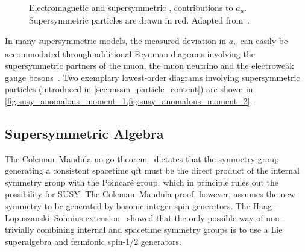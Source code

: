 \begin{figure}
\begin{subfigure}[b]{0.33\linewidth}
		\caption{\label{fig:susy_anomalous_moment_2}}
	\end{subfigure}	
	\caption{Electromagnetic  and supersymmetric ,  contributions to $a_\mu$. Supersymmetric particles are drawn in red. Adapted from~\cite{baer_tata_2006}.}\label{fig:loop_corrections_anomalous_moment}
\end{figure}

In many supersymmetric models, the measured deviation in $a_\mu$ can easily be accommodated through additional Feynman diagrams involving the supersymmetric partners of the muon, the muon neutrino and the electroweak gauge bosons~\cite{Czarnecki:2001pv,Feng:2001tr}. Two exemplary lowest-order diagrams involving supersymmetric particles (introduced in \cref{sec:mssm_particle_content}) are shown in \cref{fig:susy_anomalous_moment_1,fig:susy_anomalous_moment_2}.


\subsection{Supersymmetric Algebra}\label{sec:susy_algebra}

The Coleman--Mandula no-go theorem~\cite{PhysRev.159.1251} dictates that the symmetry group generating a consistent spacetime \gls{qft} must be the direct product of the internal symmetry group with the Poincaré group, which in principle rules out the possibility for SUSY. The Coleman--Mandula proof, however, assumes the new symmetry to be generated by bosonic integer spin generators. The Haag--Lopuszanski--Sohnius extension~\cite{Haag:1974qh} showed that the only possible way of non-trivially combining internal and spacetime symmetry groups is to use a Lie superalgebra and fermionic spin-1/2 generators.

